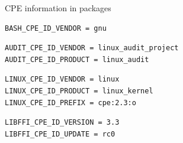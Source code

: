 \begin{frame}[fragile]{CPE information in packages}

  \begin{block}{}
\begin{verbatim}
BASH_CPE_ID_VENDOR = gnu
\end{verbatim}
  \end{block}

  \begin{block}{}
\begin{verbatim}
AUDIT_CPE_ID_VENDOR = linux_audit_project
AUDIT_CPE_ID_PRODUCT = linux_audit
\end{verbatim}
  \end{block}

  \begin{block}{}
\begin{verbatim}
LINUX_CPE_ID_VENDOR = linux
LINUX_CPE_ID_PRODUCT = linux_kernel
LINUX_CPE_ID_PREFIX = cpe:2.3:o
\end{verbatim}
  \end{block}

  \begin{block}{}
\begin{verbatim}
LIBFFI_CPE_ID_VERSION = 3.3
LIBFFI_CPE_ID_UPDATE = rc0
\end{verbatim}
  \end{block}

\end{frame}

